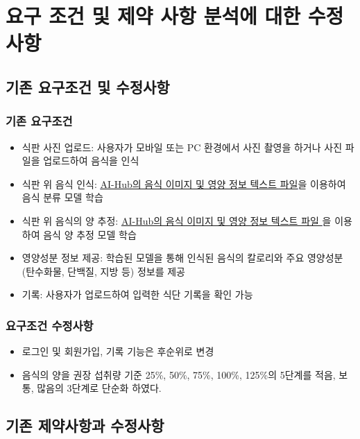 \documentclass[10pt, a4paper]{article}
\theoremstyle{definition}
\begin{document}
    \section{요구 조건 및 제약 사항 분석에 대한 수정사항}

    \subsection{기존 요구조건 및 수정사항}

    \subsubsection{기존 요구조건}
    \begin{itemize}
        \item 식판 사진 업로드: 사용자가 모바일 또는 PC 환경에서 사진 촬영을 하거나 사진 파일을 업로드하여 음식을 인식
        \item 식판 위 음식 인식: \textcolor{blue}{\underline{\href{https://www.aihub.or.kr/aihubdata/data/view.do?currMenu=115&topMenu=100&aihubDataSe=data&dataSetSn=74}{AI-Hub의 음식 이미지 및 영양 정보 텍스트 파일}}}을 이용하여 음식 분류 모델 학습
        \item 식판 위 음식의 양 추정: \textcolor{blue}{\underline{\href{https://www.aihub.or.kr/aihubdata/data/view.do?currMenu=115&topMenu=100&aihubDataSe=data&dataSetSn=74}{
            AI-Hub의 음식 이미지 및 영양 정보 텍스트 파일
        }}}을 이용하여 음식 양 추정 모델 학습
        \item 영양성분 정보 제공: 학습된 모델을 통해 인식된 음식의 칼로리와 주요 영양성분(탄수화물, 단백질, 지방 등) 정보를 제공
        \item 기록: 사용자가 업로드하여 입력한 식단 기록을 확인 가능
    \end{itemize}

    \subsubsection{요구조건 수정사항}
    \begin{itemize}
        \item 로그인 및 회원가입, 기록 기능은 후순위로 변경
        \item 음식의 양을 권장 섭취량 기준 25\%, 50\%, 75\%, 100\%, 125\%의 5단계를 적음, 보통, 많음의 3단계로 단순화 하였다.
    \end{itemize}

    \subsection{기존 제약사항과 수정사항}
\end{document}
